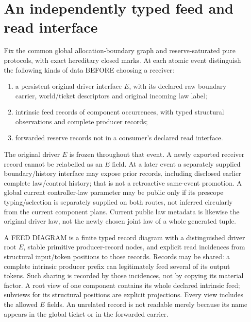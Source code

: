 \documentclass[11pt]{article}
\begin{document}
\section{An independently typed feed and read interface}
Fix the common global allocation-boundary graph and reserve-saturated pure protocols, with exact hereditary closed marks. At each atomic event distinguish the following kinds of data BEFORE choosing a receiver:
\begin{enumerate}
\item a persistent original driver interface $E$, with its declared raw boundary carrier, world/ticket descriptors and original incoming law label;
\item intrinsic feed records of component occurrences, with typed structural observations and complete producer records;
\item forwarded reserve records not in a consumer's declared read interface.
\end{enumerate}
The original driver $E$ is frozen throughout that event. A newly exported receiver record cannot be relabelled as an $E$ field. At a later event a separately supplied boundary/history interface may expose prior records, including disclosed earlier complete law/control history; that is not a retroactive same-event promotion. A global current controller-law parameter may be public only if its prescope typing/selection is separately supplied on both routes, not inferred circularly from the current component plans. Current public law metadata is likewise the original driver law, not the newly chosen joint law of a whole generated tuple.

A FEED DIAGRAM is a finite typed record diagram with a distinguished driver root $E$, stable primitive producer-record nodes, and explicit read incidences from structural input/token positions to those records. Records may be shared: a complete intrinsic producer prefix can legitimately feed several of its output tokens. Such sharing is recorded by those incidences, not by copying its material factor. A root view of one component contains its whole declared intrinsic feed; subviews for its structural positions are explicit projections. Every view includes the allowed $E$ fields. An unrelated record is not readable merely because its name appears in the global ticket or in the forwarded carrier.
\end{document}
